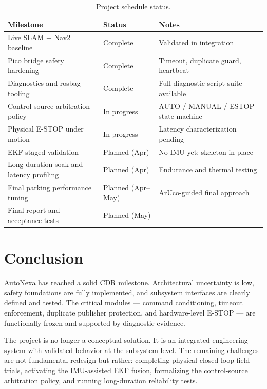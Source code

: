 \documentclass[12pt,a4paper]{report}
\newcommand{\pname}{AutoNexa}
\begin{document}
\begin{table}[H]
\centering
\caption{Project schedule status.}
\label{tab:schedule}
\begin{tabularx}{\textwidth}{|p{3cm}|p{2cm}|X|}
\hline
\textbf{Milestone} & \textbf{Status} & \textbf{Notes} \\
\hline
Live SLAM + Nav2 baseline & Complete & Validated in integration \\
\hline
Pico bridge safety hardening & Complete & Timeout, duplicate guard, heartbeat \\
\hline
Diagnostics and rosbag tooling & Complete & Full diagnostic script suite available \\
\hline
Control-source arbitration policy & In progress & AUTO / MANUAL / ESTOP state machine \\
\hline
Physical E-STOP under motion & In progress & Latency characterization pending \\
\hline
EKF staged validation & Planned (Apr) & No IMU yet; skeleton in place \\
\hline
Long-duration soak and latency profiling & Planned (Apr) & Endurance and thermal testing \\
\hline
Final parking performance tuning & Planned (Apr--May) & ArUco-guided final approach \\
\hline
Final report and acceptance tests & Planned (May) & --- \\
\hline
\end{tabularx}
\end{table}

\chapter{Conclusion}

\pname{} has reached a solid CDR milestone. Architectural uncertainty is low, safety foundations are fully implemented, and subsystem interfaces are clearly defined and tested. The critical modules --- command conditioning, timeout enforcement, duplicate publisher protection, and hardware-level E-STOP --- are functionally frozen and supported by diagnostic evidence.

The project is no longer a conceptual solution. It is an integrated engineering system with validated behavior at the subsystem level. The remaining challenges are not fundamental redesign but rather: completing physical closed-loop field trials, activating the IMU-assisted EKF fusion, formalizing the control-source arbitration policy, and running long-duration reliability tests.
\end{document}
